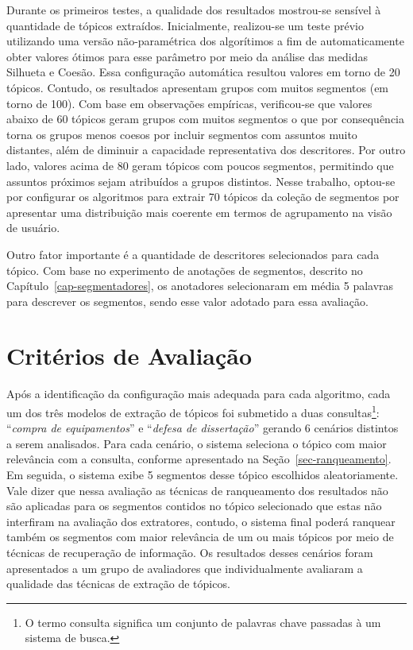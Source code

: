 Durante os primeiros testes, a qualidade dos resultados mostrou-se sensível à quantidade de tópicos extraídos.
Inicialmente, realizou-se um teste prévio utilizando uma versão não-paramétrica dos algorítimos a fim de automaticamente obter valores ótimos para esse parâmetro por meio da análise das medidas Silhueta e Coesão. Essa configuração automática resultou valores em torno de 20 tópicos. Contudo, os resultados apresentam grupos com muitos segmentos (em torno de 100).
Com base em observações empíricas, verificou-se que valores abaixo de 60 tópicos geram grupos com muitos segmentos o que por consequência torna os grupos menos coesos por incluir segmentos com assuntos muito distantes, além de diminuir a capacidade representativa dos descritores. Por outro lado, valores acima de 80 geram tópicos com poucos segmentos, permitindo que assuntos próximos sejam atribuídos a grupos distintos. Nesse trabalho, optou-se por configurar os algoritmos para extrair 70 tópicos da coleção de segmentos por apresentar uma distribuição mais coerente em termos de agrupamento na visão de usuário.

Outro fator importante é a quantidade de descritores selecionados para cada tópico. Com base no experimento de anotações de segmentos, descrito no Capítulo~\ref{cap-segmentadores}, os anotadores selecionaram em média 5 palavras para descrever os segmentos, sendo esse valor adotado para essa avaliação.




\section{Critérios de Avaliação}

Após a identificação da configuração mais adequada para cada algoritmo, cada um dos três modelos de extração de tópicos foi submetido a duas consultas\footnote{O termo consulta significa um conjunto de palavras chave passadas à um sistema de busca.}: ``\textit{compra de equipamentos}'' e ``\textit{defesa de dissertação}'' gerando 6 cenários distintos a serem analisados. 
Para cada cenário, o sistema seleciona o tópico com maior relevância com a consulta, conforme apresentado na Seção~\ref{sec-ranqueamento}.
Em seguida, o sistema exibe 5 segmentos desse tópico escolhidos aleatoriamente. 
Vale dizer que nessa avaliação as técnicas de ranqueamento dos resultados não são aplicadas para os segmentos contidos no tópico selecionado que estas não interfiram na avaliação dos extratores, contudo, o sistema final poderá ranquear também os segmentos com maior relevância de um ou mais tópicos por meio de técnicas de recuperação de informação. 
Os resultados desses cenários foram apresentados a um grupo de avaliadores que individualmente avaliaram a qualidade das técnicas de extração de tópicos. 
%

